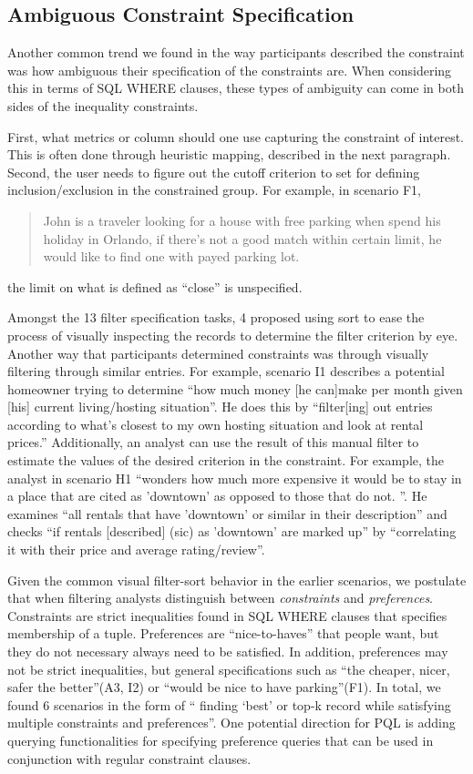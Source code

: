 \documentclass{sig-alternate-05-2015}
\begin{document}
\subsection{Ambiguous Constraint Specification}
  Another common trend we found in the way participants described the constraint was how ambiguous their specification of the constraints are. When considering this in terms of SQL WHERE clauses, these types of ambiguity can come in both sides of the inequality constraints. 
  \par First, what metrics or column should one use capturing the constraint of interest. This is often done through heuristic mapping, described in the next paragraph. Second, the user needs to figure out the cutoff criterion to set for defining inclusion/exclusion in the constrained group. For example, in scenario F1, 
  \begin{quote}
  John is a traveler looking for a house with free parking when spend his holiday in Orlando, if there's not a good match within certain limit, he would like to find one with payed parking lot.  
  \end{quote}
  the limit on what is defined as ``close'' is unspecified.  
  \par Amongst the 13 filter specification tasks, 4 proposed using sort to ease the process of visually inspecting the records to determine the filter criterion by eye. Another way that participants determined constraints was through visually filtering through similar entries. For example, scenario I1 describes a potential homeowner trying to determine ``how much money [he can]make per month given [his] current living/hosting situation''. He does this by ``filter[ing] out entries according to what's closest to my own hosting situation and look at rental prices.'' Additionally, an analyst can use the result of this manual filter to estimate the values of the desired criterion in the constraint.  For example, the analyst in scenario H1 ``wonders how much more expensive it would be to stay in a place that are cited as 'downtown' as opposed to those that do not. ''. He examines ``all rentals that have 'downtown' or similar in their description'' and checks ``if rentals [described] (sic) as 'downtown' are marked up'' by ``correlating it with their price and average rating/review''.
  \par Given the common visual filter-sort behavior in the earlier scenarios, we postulate that when filtering analysts distinguish between \textit{constraints} and \textit{preferences}. Constraints are strict inequalities found in SQL WHERE clauses that specifies membership of a tuple. Preferences are ``nice-to-haves'' that people want, but they do not necessary always need to be satisfied. In addition, preferences may not be strict inequalities, but general specifications such as ``the cheaper, nicer, safer the better''(A3, I2) or ``would be nice to have parking''(F1). In total, we found 6 scenarios in the form of `` finding `best' or top-k record while satisfying multiple constraints and preferences''. One potential direction for PQL is adding querying functionalities for specifying preference queries that can be used in conjunction with regular constraint clauses. 
\end{document}
